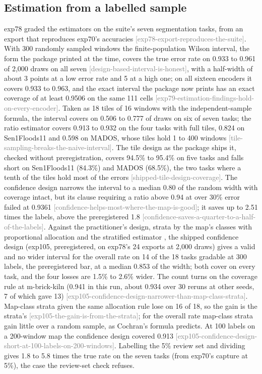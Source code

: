 \documentclass[11pt,a4paper]{article}
\newcommand{\claim}[1]{{\scriptsize\textsf{\textcolor{gray}{[#1]}}}}
\begin{document}
\subsection{Estimation from a labelled sample}
\label{sec:res-estimate}

exp78 graded the estimators on the suite's seven segmentation tasks, from an export that reproduces exp70's
accuracies \claim{exp78-export-reproduces-the-suite}. With 300 randomly sampled windows the finite-population Wilson
interval, the form the package printed at the time, covers the true error rate on 0.933 to 0.961 of 2,000 draws on all
seven \claim{design-based-interval-is-honest}, with a half-width of about 3 points at a low error rate and 5 at a high
one; on all sixteen encoders it covers 0.933 to 0.963, and the exact interval the package now prints has an exact
coverage of at least 0.9506 on the same 111 cells \claim{exp79-estimation-findings-hold-on-every-encoder}. Taken as
18 tiles of 16 windows with the independent-sample formula, the interval covers on 0.506 to 0.777 of draws on six of
seven tasks; the ratio estimator covers 0.913 to 0.932 on the four tasks with full tiles, 0.824 on Sen1Floods11 and
0.598 on MADOS, whose tiles hold 1 to 400 windows \claim{tile-sampling-breaks-the-naive-interval}. The tile design as
the package ships it, checked without preregistration, covers 94.5\% to 95.4\% on five tasks and falls short on Sen1Floods11 (84.3\%) and MADOS (68.5\%), the two tasks where a tenth of the
tiles hold most of the errors \claim{shipped-tile-design-coverage}. The confidence design narrows the interval to a
median 0.80 of the random width with coverage intact, but its clause requiring a ratio above 0.94 at over 30\% error
failed at 0.9361 \claim{confidence-helps-most-where-the-map-is-good}; it saves up to 2.51 times the labels, above the
preregistered 1.8 \claim{confidence-saves-a-quarter-to-a-half-of-the-labels}. Against the practitioner's design,
strata by the map's classes with proportional allocation and the stratified estimator \citep{olofsson2014}, the
shipped confidence design (exp105, preregistered, on exp78's 24 exports at 2,000 draws) gives a valid and no wider
interval for the overall rate on 14 of the 18 tasks gradable at 300 labels, the preregistered bar, at a median 0.853 of
the width; both cover on every task, and the four losses are 1.5\% to 2.6\% wider. The count turns on the coverage
rule at m-brick-kiln (0.941 in this run, about 0.934 over 30 reruns at other seeds, 7 of which gave 13)
\claim{exp105-confidence-design-narrower-than-map-class-strata}. Map-class strata given the same allocation rule lose on
16 of 18, so the gain is the strata's \claim{exp105-the-gain-is-from-the-strata}; for the overall rate map-class
strata gain little over a random sample, as Cochran's formula predicts. At 100 labels on a 200-window map the
confidence design covered 0.913 \claim{exp105-confidence-design-short-at-100-labels-on-200-windows}. Labelling the 5\% review set and dividing
gives 1.8 to 5.8 times the true rate on the seven tasks (from exp70's capture at 5\%), the case the review-set check
refuses.
\end{document}

